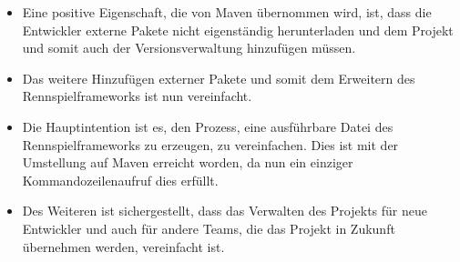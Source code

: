 \begin{itemize}
	\item Eine positive Eigenschaft, die von Maven übernommen wird, ist, dass die Entwickler externe Pakete nicht eigenständig herunterladen und dem Projekt und somit auch der Versionsverwaltung hinzufügen müssen. 
	\item Das weitere Hinzufügen externer Pakete und somit dem Erweitern des Rennspielframeworks ist nun vereinfacht. 
	\item Die Hauptintention ist es, den Prozess, eine ausführbare Datei des Rennspielframeworks zu erzeugen, zu vereinfachen. Dies ist mit der Umstellung auf Maven erreicht worden, da nun ein einziger Kommandozeilenaufruf dies erfüllt.
	\item Des Weiteren ist sichergestellt, dass das Verwalten des Projekts für neue Entwickler und auch für andere Teams, die das Projekt in Zukunft übernehmen werden, vereinfacht ist.
\end{itemize}




